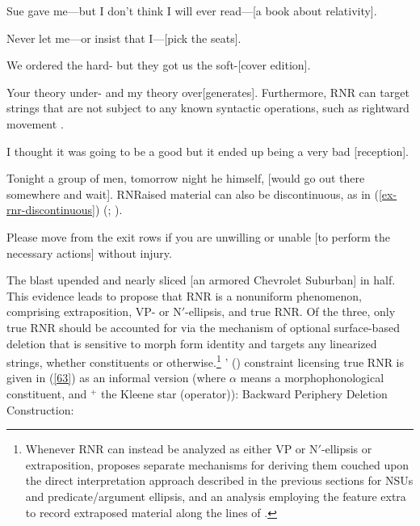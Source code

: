 {\eal
\ex Sue gave me---but I don't think I will ever read---[a book about relativity]. \label{54}

\ex Never let me---or insist that I---[pick the seats].\label{55}

\ex We ordered the hard- but they got us the soft-[cover edition].\label{56}

\ex Your theory under- and my theory over[generates].\label{57}\zl
%
Furthermore, RNR can target strings that are not subject to any known syntactic operations, such as rightward movement \citep[865]{Chaves2014}.

\eal
\ex I thought it was going to be a good but it ended up being a very bad [reception].\label{58}

\ex Tonight a group of men, tomorrow night he himself, [would go out there somewhere and wait].\label{59}\zl
RNRaised material can also be discontinuous, as in (\ref{ex-rnr-discontinuous}) (\citealt[868]{Chaves2014}; \citealt[238--240]{Whitman2009}).

\eal
\label{ex-rnr-discontinuous}
\ex Please move from the exit rows if you are unwilling or unable [to perform the necessary actions] without injury.\label{61}

\ex The blast upended and nearly sliced [an armored Chevrolet Suburban] in half.\label{62}\zl
%
This evidence leads \citet{Chaves2014} to propose that RNR is a nonuniform phenomenon, comprising extraposition,  VP- or N$'$-ellipsis, and true RNR.
%
%
%
Of the three, only true RNR should be accounted for via the mechanism of optional surface-based deletion that is sensitive to morph form identity and targets any linearized strings, whether constituents or otherwise.\footnote{Whenever RNR can instead be analyzed as either VP or N$'$-ellipsis or extraposition, \citet{Chaves2014} proposes separate mechanisms for deriving them couched upon the direct interpretation approach described in the previous sections for NSUs and predicate/argument ellipsis, and an analysis employing the feature extra to record extraposed material along the lines of \citet{KimSag2005, Kay2012}.} \citeauthor{Chaves2014}' (\citeyear[874]{Chaves2014}) constraint licensing true RNR is given in (\ref{63}) as an informal version  (where $\alpha$ means a morphophonological constituent, and $^{+}$ the Kleene star (operator)):
%
%
%
%
\ea
\label{63}
 Backward Periphery Deletion Construction:\\

}
